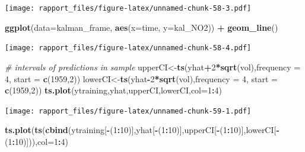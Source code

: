 \documentclass[]{article}
\newenvironment{Shaded}{\begin{snugshade}}{\end{snugshade}}
\newcommand{\KeywordTok}[1]{\textcolor[rgb]{0.13,0.29,0.53}{\textbf{#1}}}
\newcommand{\DataTypeTok}[1]{\textcolor[rgb]{0.13,0.29,0.53}{#1}}
\newcommand{\DecValTok}[1]{\textcolor[rgb]{0.00,0.00,0.81}{#1}}
\newcommand{\StringTok}[1]{\textcolor[rgb]{0.31,0.60,0.02}{#1}}
\newcommand{\CommentTok}[1]{\textcolor[rgb]{0.56,0.35,0.01}{\textit{#1}}}
\newcommand{\OperatorTok}[1]{\textcolor[rgb]{0.81,0.36,0.00}{\textbf{#1}}}
\newcommand{\NormalTok}[1]{#1}
\begin{document}
\texttt{[image: rapport\_files/figure-latex/unnamed-chunk-58-3.pdf]}

\begin{Shaded}
\begin{Highlighting}[]
\KeywordTok{ggplot}\NormalTok{(}\DataTypeTok{data=}\NormalTok{kalman_frame, }\KeywordTok{aes}\NormalTok{(}\DataTypeTok{x=}\NormalTok{time, }\DataTypeTok{y=}\NormalTok{kal_NO2)) }\OperatorTok{+}\StringTok{ }\KeywordTok{geom_line}\NormalTok{()}
\end{Highlighting}
\end{Shaded}

\texttt{[image: rapport\_files/figure-latex/unnamed-chunk-58-4.pdf]}

\begin{Shaded}
\begin{Highlighting}[]
\CommentTok{# intervals of predictions in sample}
\NormalTok{upperCI<-}\KeywordTok{ts}\NormalTok{(yhat}\OperatorTok{+}\DecValTok{2}\OperatorTok{*}\KeywordTok{sqrt}\NormalTok{(vol),}\DataTypeTok{frequency =} \DecValTok{4}\NormalTok{, }\DataTypeTok{start =} \KeywordTok{c}\NormalTok{(}\DecValTok{1959}\NormalTok{,}\DecValTok{2}\NormalTok{))}
\NormalTok{lowerCI<-}\KeywordTok{ts}\NormalTok{(yhat}\OperatorTok{-}\DecValTok{2}\OperatorTok{*}\KeywordTok{sqrt}\NormalTok{(vol),}\DataTypeTok{frequency =} \DecValTok{4}\NormalTok{, }\DataTypeTok{start =} \KeywordTok{c}\NormalTok{(}\DecValTok{1959}\NormalTok{,}\DecValTok{2}\NormalTok{))}
\KeywordTok{ts.plot}\NormalTok{(ytraining,yhat,upperCI,lowerCI,}\DataTypeTok{col=}\DecValTok{1}\OperatorTok{:}\DecValTok{4}\NormalTok{)}
\end{Highlighting}
\end{Shaded}

\texttt{[image: rapport\_files/figure-latex/unnamed-chunk-59-1.pdf]}

\begin{Shaded}
\begin{Highlighting}[]
\KeywordTok{ts.plot}\NormalTok{(}\KeywordTok{ts}\NormalTok{(}\KeywordTok{cbind}\NormalTok{(ytraining[}\OperatorTok{-}\NormalTok{(}\DecValTok{1}\OperatorTok{:}\DecValTok{10}\NormalTok{)],yhat[}\OperatorTok{-}\NormalTok{(}\DecValTok{1}\OperatorTok{:}\DecValTok{10}\NormalTok{)],upperCI[}\OperatorTok{-}\NormalTok{(}\DecValTok{1}\OperatorTok{:}\DecValTok{10}\NormalTok{)],lowerCI[}\OperatorTok{-}\NormalTok{(}\DecValTok{1}\OperatorTok{:}\DecValTok{10}\NormalTok{)])),}\DataTypeTok{col=}\DecValTok{1}\OperatorTok{:}\DecValTok{4}\NormalTok{)}
\end{Highlighting}
\end{Shaded}
\end{document}
